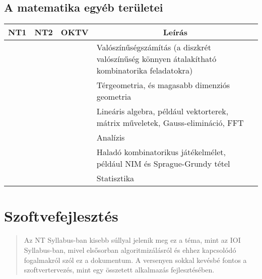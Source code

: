 \documentclass[a4paper,11pt,oneside]{article}
\newcommand{\xmark}{\ding{55}}%
\newcommand{\cnfoc}{{\small\faQuestion}}
\newcommand{\cexcl}{{\small\xmark}}
\newcommand{\ctable}[1]{
    \begin{center}
        \begin{longtable}{ | C | C | C | m{8cm} | } %
        \hline
        \textbf{NT1} & \textbf{NT2} & \textbf{OKTV} & \multicolumn{1}{|c|}{\textbf{Leírás}} \\ \hline
        \endhead
        #1
        \end{longtable}
    \end{center}
}
\begin{document}
\subsection {A matematika egyéb területei} %
\label{subsubsec:other-mathematics}

\ctable {
    \cnfoc & \cnfoc & \cnfoc & Valószínűségszámítás (a diszkrét valószínűség könnyen
    átalakítható kombinatorika feladatokra)
    \\ \hline  %
    \cexcl & \cexcl & \cexcl & Térgeometria, és magasabb dimenziós geometria
    \\ \hline  %
    \cexcl & \cexcl & \cexcl & Lineáris algebra, például vektorterek, mátrix műveletek,
    Gauss-elimináció, FFT
    \\ \hline  %
    \cexcl & \cexcl & \cexcl & Analízis
    \\ \hline  %
    \cexcl & \cexcl & \cexcl & Haladó kombinatorikus játékelmélet, például NIM és Sprague-Grundy tétel
    \\ \hline  %
    \cexcl & \cexcl & \cexcl & Statisztika
    \\ \hline  %

}

\section {Szoftvefejlesztés} %
\label{subsec:software-engineering}

\begin{quote}
    Az NT Syllabus-ban kisebb súllyal jelenik meg ez a téma, mint az IOI Syllabus-ban, mivel
    elsősorban algoritmizálásról és ehhez kapcsolódó fogalmakról szól ez a dokumentum. A versenyen
    sokkal kevésbé fontos a szoftvertervezés, mint egy összetett alkalmazás fejlesztésében.
\end{quote}
\end{document}
